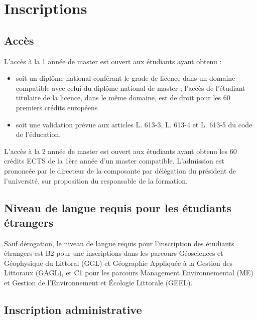 \documentclass[a4paper,11pt]{article}
\begin{document}

\section{Inscriptions}\label{Inscriptions}
\subsection{Accès}\label{Acces}
\setcounter{page}{1}

L'accès à la 1\iere{} année de master est ouvert aux étudiants ayant obtenu :
\begin{itemize} 
\item soit un diplôme national conférant le grade de licence dans un domaine compatible avec celui du diplôme national de master ; l'accès de l'étudiant titulaire de la licence, dans le même domaine, est de droit pour les 60 premiers crédits européens
\item soit une validation prévue aux articles L. 613-3, L. 613-4 et L. 613-5 du code de l'éducation.
\end{itemize}

L'accès à la 2\ieme{} année de master est ouvert aux étudiants ayant obtenu les 60 crédits ECTS de la 1ère année d'un master compatible. L'admission est prononcée par le directeur de la composante par délégation du président de l'université, sur proposition du responsable de la formation.


\subsection{Niveau de langue requis pour les étudiants étrangers}\label{langue}
Sauf dérogation, le niveau de langue requis pour l'inscription des étudiants étrangers est B2 pour une inscriptions dans les parcours Géosciences et Géophysique du Littoral (GGL) et Géographie Appliquée à la Gestion des Littoraux (GAGL), et C1 pour les parcours Management Environnemental (ME) et Gestion de l'Environnement et Écologie Littorale (GEEL).

\subsection{Inscription administrative}\label{InsciprtionAdministrative}
\end{document}
